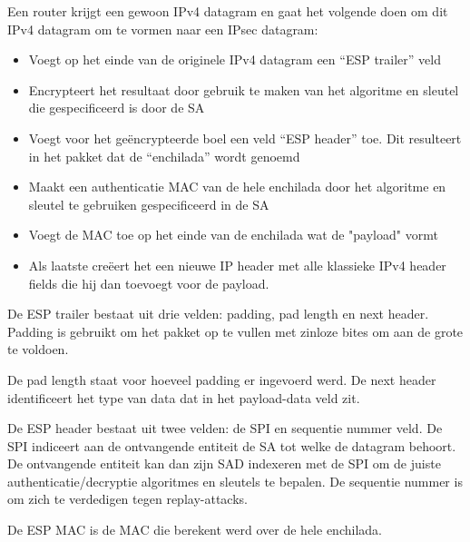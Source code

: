 \noindent Een router krijgt een gewoon IPv4 datagram en gaat het volgende doen om dit IPv4 datagram om te vormen naar een IPsec datagram:
\begin{itemize}
\item Voegt op het einde van de originele IPv4 datagram een “ESP trailer” veld
\item Encrypteert het resultaat door gebruik te maken van het algoritme en sleutel die gespecificeerd is door de SA
\item Voegt voor het geëncrypteerde boel een veld “ESP header” toe. Dit resulteert in het pakket dat de “enchilada” wordt genoemd
\item Maakt een authenticatie MAC van de hele enchilada door het algoritme en sleutel te gebruiken gespecificeerd in de SA
\item Voegt de MAC toe op het einde van de enchilada wat de "payload" vormt
\item Als laatste creëert het een nieuwe IP header met alle klassieke IPv4 header fields die hij dan toevoegt voor de payload.
\end{itemize}

\noindent De ESP trailer bestaat uit drie velden: padding, pad length en next header. Padding is gebruikt om het pakket op te vullen met zinloze bites om aan de grote te voldoen. 

\noindent De pad length staat voor hoeveel padding er ingevoerd werd. De next header identificeert het type van data dat in het payload-data veld zit.

\noindent De ESP header bestaat uit twee velden: de SPI en sequentie nummer veld. De SPI indiceert aan de ontvangende entiteit de SA tot welke de datagram behoort. De ontvangende entiteit kan dan zijn SAD indexeren met de SPI om de juiste authenticatie/decryptie algoritmes en sleutels te bepalen. De sequentie nummer is om zich te verdedigen tegen replay-attacks.

\clearpage

\noindent De ESP MAC is de MAC die berekent werd over de hele enchilada.

